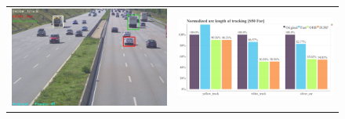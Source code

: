 \begin{figure}[!ht]
  \centering
  \begin{tabular}{cc}
    \includegraphics[width=0.45\linewidth]{diagrams/object_tracking/s50_s_far/frame.png}    &  
    \includegraphics[width=0.475\linewidth]{diagrams/object_tracking/s50_s_far/normalized_arc_lengths.html.png}    \\


\end{tabular}
\end{figure}

